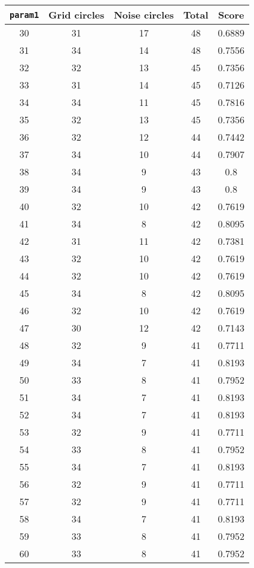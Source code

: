 \documentclass[letterpaper, 12pt]{article}
\begin{document}
\begin{longtable}{|c|c|c|c|c|}
\hline
\textbf{\texttt{param1}} & \textbf{Grid circles} & \textbf{Noise circles} & \textbf{Total} & \textbf{Score} \\
\hline
30 & 31 & 17 & 48 & 0.6889 \\
\hline
31 & 34 & 14 & 48 & 0.7556 \\
\hline
32 & 32 & 13 & 45 & 0.7356 \\
\hline
33 & 31 & 14 & 45 & 0.7126 \\
\hline
34 & 34 & 11 & 45 & 0.7816 \\
\hline
35 & 32 & 13 & 45 & 0.7356 \\
\hline
36 & 32 & 12 & 44 & 0.7442 \\
\hline
37 & 34 & 10 & 44 & 0.7907 \\
\hline
38 & 34 & 9 & 43 & 0.8 \\
\hline
39 & 34 & 9 & 43 & 0.8 \\
\hline
40 & 32 & 10 & 42 & 0.7619 \\
\hline
41 & 34 & 8 & 42 & 0.8095 \\
\hline
42 & 31 & 11 & 42 & 0.7381 \\
\hline
43 & 32 & 10 & 42 & 0.7619 \\
\hline
44 & 32 & 10 & 42 & 0.7619 \\
\hline
45 & 34 & 8 & 42 & 0.8095 \\
\hline
46 & 32 & 10 & 42 & 0.7619 \\
\hline
47 & 30 & 12 & 42 & 0.7143 \\
\hline
48 & 32 & 9 & 41 & 0.7711 \\
\hline
49 & 34 & 7 & 41 & 0.8193 \\
\hline
50 & 33 & 8 & 41 & 0.7952 \\
\hline
51 & 34 & 7 & 41 & 0.8193 \\
\hline
52 & 34 & 7 & 41 & 0.8193 \\
\hline
53 & 32 & 9 & 41 & 0.7711 \\
\hline
54 & 33 & 8 & 41 & 0.7952 \\
\hline
55 & 34 & 7 & 41 & 0.8193 \\
\hline
56 & 32 & 9 & 41 & 0.7711 \\
\hline
57 & 32 & 9 & 41 & 0.7711 \\
\hline
58 & 34 & 7 & 41 & 0.8193 \\
\hline
59 & 33 & 8 & 41 & 0.7952 \\
\hline
60 & 33 & 8 & 41 & 0.7952 \\
\hline

\end{longtable}
\end{document}
